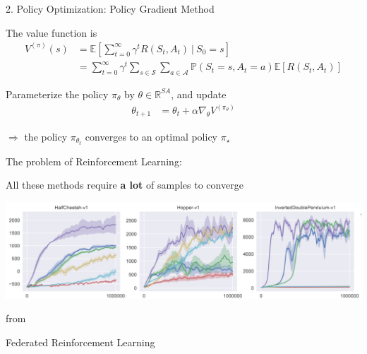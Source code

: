 \documentclass[12pt,aspectratio=169]{beamer}
\begin{document}
\begin{frame}{2. Policy Optimization: Policy Gradient Method}

  \pause
  
  The value function is
  \begin{align*}
    V^{(\pi)}(s)
    & =
      \mathbb{E}\left[
      \sum_{t=0}^\infty \gamma^t R(S_{t},A_{t})
      ~\bigg|~ {S_{0}=s}
      \right]
    \\
    & =
      \sum_{t=0}^\infty
      \gamma^t
      \sum_{s \in \mathcal{S}} \sum_{a \in \mathcal{A}}
      \mathbb{P}(S_t = s, A_t = a)
      \mathbb{E}[R(S_{t},A_{t})]
  \end{align*}

  Parameterize the policy $\pi_\theta$ by $\theta \in \mathbb{R}^{SA}$, and update
  \begin{align*}
    \theta_{t+1}
    & =
      \theta_t
      + \alpha \nabla_\theta V^{(\pi_\theta)}
  \end{align*}

  \textcolor{amaranth}{$\boldsymbol{\Rightarrow}$} the policy $\pi_{\theta_t}$ converges to an optimal policy $\pi_{\star}$
\end{frame}

\begin{frame}{The problem of Reinforcement Learning:}
  \begin{center}
    \Large
    All these methods require \textbf{a lot} of samples to converge
    
    \includegraphics[width=\textwidth]{images/millionsamples.png}
  \end{center}

  from 
  
\end{frame}

\begin{frame}

  \begin{center}
    \textcolor{amaranth}{
      \huge   {Federated Reinforcement Learning}
    }
  \end{center}
\end{frame}
\end{document}
